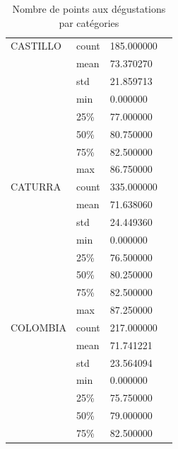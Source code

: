 \begin{table}[H]
	\centering
	\caption{Nombre de points aux dégustations par catégories}
	\label{VariedadPoints}
	\begin{tabular}{llll}
		CASTILLO & count                              & 185.000000 &  \\
		&mean     & 73.370270                                      &  \\
		&std      & 21.859713                                      &  \\
		&min      & 0.000000                                       &  \\
		&25\%     & 77.000000                                      &  \\
		&50\%     & 80.750000                                      &  \\
		&75\%     & 82.500000                                      &  \\
		&max      & 86.750000                                      &  \\
		CATURRA  & count                              & 335.000000 &  \\
		&mean     & 71.638060                                      &  \\
		&std      & 24.449360                                      &  \\
		&min      & 0.000000                                       &  \\
		&25\%     & 76.500000                                      &  \\
		&50\%     & 80.250000                                      &  \\
		&75\%     & 82.500000                                      &  \\
		&max      & 87.250000                                      &  \\
		COLOMBIA & count                              & 217.000000 &  \\
		&mean     & 71.741221                                      &  \\
		&std      & 23.564094                                      &  \\
		&min      & 0.000000                                       &  \\
		&25\%     & 75.750000                                      &  \\
		&50\%     & 79.000000                                      &  \\
		&75\%     & 82.500000                                      &  \\

\end{tabular}
\end{table}
